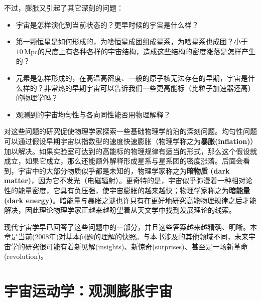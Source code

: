 不过，膨胀又引起了其它深刻的问题：
\begin{itemize}
\item 宇宙是怎样演化到当前状态的？更早时候的宇宙是什么样？
\item 第一颗恒星是如何形成的，为啥恒星成团组成星系，为啥星系也成团？小于$10 \,\text{Mpc}$的尺度上有各种各样的宇宙结构，造成这些结构的密度涨落是怎样产生的？
\item 元素是怎样形成的，在高温高密度、一般的原子核无法存在的早期，宇宙是什么样的？非常热的早期宇宙可以告诉我们一些更高能标（比粒子加速器还高）的物理学吗？
\item 观测到的宇宙均匀性与各向同性能否用物理解释？
\end{itemize}

对这些问题的研究促使物理学家探索一些基础物理学前沿的深刻问题。均匀性问题可以通过假设早期宇宙以指数型的速度快速膨胀（物理学称之为\textbf{暴胀(inflation)}）加以解决。如果实验室可达到的高能标的物理规律有适当的形式，那么这个假设就成立，如果它成立，那么还能额外解释形成星系与星系团的密度涨落。后面会看到，宇宙中的大部分物质似乎都是未知的，物理学家称之为\textbf{暗物质 (dark matter)}，因为它不发光（电磁辐射）。更奇特的是，宇宙似乎弥漫着一种相对论性的能量密度，它具有负压强，使宇宙膨胀的越来越快；物理学家称之为\textbf{暗能量 (dark energy)}。暗能量与暴胀之谜也许只有在更好地研究高能物理规律之后才能解决，因此理论物理学家正越来越盼望着从天文学中找到发展理论的线索。

现代宇宙学早已回答了这些问题中的一部分，并且这些答案越来越精确、明晰。本章是当前(2008年)对基本问题的理解的快照。与本书涉及的其他领域不同，未来宇宙学的研究很可能有着新见解(insights)、新惊奇(surprises)、甚至是一场新革命(revolution)。

\section{宇宙运动学：观测膨胀宇宙}
\label{sec12.2}